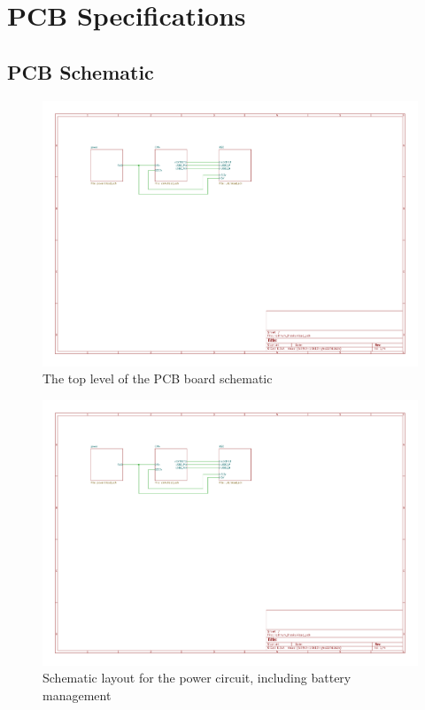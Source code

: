\chapter{PCB Specifications} %

\label{AppendixA} %

\section{PCB Schematic}

\begin{figure}[h]
  \centering
  \includegraphics[width=1\textwidth,page=1]{Figures/kicad/lathrum_thesis_schematic.pdf}
  \captionsetup{width=.8\linewidth}
  \caption[Top Level Schematic]{The top level of the PCB board schematic}
  \label{fig:pcb_schematic_top}
\end{figure}

\begin{figure}[h]
  \centering
  \includegraphics[width=1\textwidth,page=2]{Figures/kicad/lathrum_thesis_schematic.pdf}
  \captionsetup{width=.8\linewidth}
  \caption[Power Schematic]{Schematic layout for the power circuit, including battery management}
  \label{fig:pcb_schematic_battery}
\end{figure}

